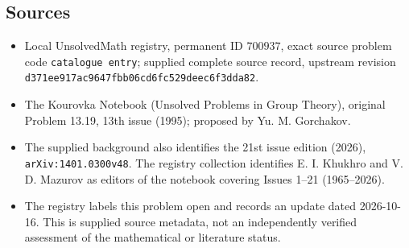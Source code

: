 \documentclass[11pt]{article}
\begin{document}
\subsection{Sources}
\begin{itemize}
\item Local UnsolvedMath registry, permanent ID \(700937\), exact source problem code \texttt{catalogue entry}; supplied complete source record, upstream revision \texttt{d371ee917ac9647fbb06cd6fc529deec6f3dda82}.
\item The Kourovka Notebook (Unsolved Problems in Group Theory), original Problem 13.19, 13th issue (1995); proposed by Yu. M. Gorchakov.
\item The supplied background also identifies the 21st issue edition (2026), \texttt{arXiv:1401.0300v48}. The registry collection identifies E. I. Khukhro and V. D. Mazurov as editors of the notebook covering Issues 1--21 (1965--2026).
\item The registry labels this problem open and records an update dated 2026-10-16. This is supplied source metadata, not an independently verified assessment of the mathematical or literature status.
\end{itemize}
\end{document}
